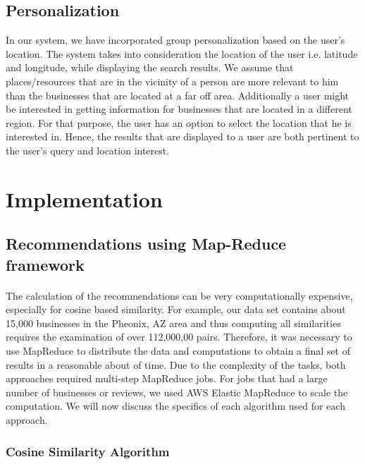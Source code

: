 \documentclass[paper=letter, fontsize=15pt]{article} %
\begin{document}
\subsection{Personalization}
In our system, we have incorporated group personalization based on the user's location. The system takes into consideration the location of the user i.e. latitude and longitude, while displaying the search results. We assume that places/resources that are in the vicinity of a person are more relevant to him than the businesses that are located at a far off area. Additionally a user might be interested in getting information for businesses that are located in a different region. For that purpose, the user has an option to select the location that he is interested in. Hence, the results that are displayed to a user are both pertinent to the user's query and location interest.    
\section{Implementation}



\subsection{Recommendations using Map-Reduce framework}
  

\paragraph{}The calculation of the recommendations can be very computationally expensive, especially for cosine based similarity. For example, our data set contains about 15,000 businesses in the Pheonix, AZ area and thus computing all similarities requires the examination of over 112,000,00 pairs. Therefore, it was necessary to use MapReduce to distribute the data and computations to obtain a final set of results in a reasonable about of time. Due to the complexity of the tasks, both approaches required multi-step MapReduce jobs. For jobs that had a large number of businesses or reviews, we used AWS Elastic MapReduce to scale the computation. We will now discuss the specifics of each algorithm used for each approach. 

\subsubsection{Cosine Similarity Algorithm}
\end{document}

